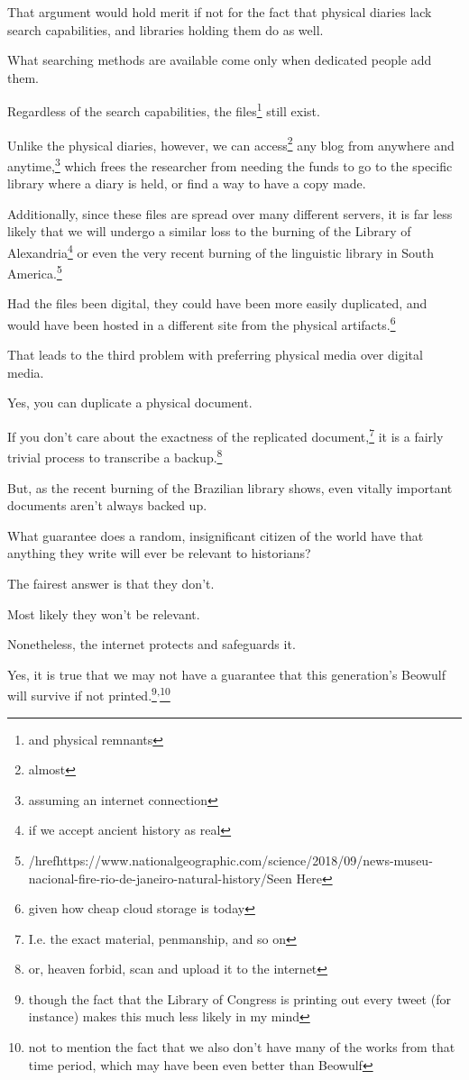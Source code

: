 \documentclass[12pt]{article}[titlepage]
\newcommand{\1}{\={a}}
\newcommand{\2}{\={e}}
\newcommand{\3}{\={\i}}
\newcommand{\4}{\=o}
\newcommand{\5}{\=u}
\newcommand{\6}{\={A}}
\renewcommand{\,}{\textsuperscript{,}}
\begin{document}
That argument would hold merit if not for the fact that physical diaries lack search capabilities, and libraries holding them do as well.

What searching methods are available come only when dedicated people add them.

Regardless of the search capabilities, the files\footnote{and physical remnants} still exist.

Unlike the physical diaries, however, we can access\footnote{almost} any blog from anywhere and anytime,\footnote{assuming an internet connection} which frees the researcher from needing the funds to go to the specific library where a diary is held, or find a way to have a copy made.


Additionally, since these files are spread over many different servers, it is far less likely that we will undergo a similar loss to the burning of the Library of Alexandria\footnote{if we accept ancient history as real} or even the very recent burning of the linguistic library in South America.\footnote{/href{https://www.nationalgeographic.com/science/2018/09/news-museu-nacional-fire-rio-de-janeiro-natural-history/}{Seen Here}}

Had the files been digital, they could have been more easily duplicated, and would have been hosted in a different site from the physical artifacts.\footnote{given how cheap cloud storage is today}


That leads to the third problem with preferring physical media over digital media.

Yes, you can duplicate a physical document.

If you don’t care about the exactness of the replicated document,\footnote{I.e. the exact material, penmanship, and so on} it is a fairly trivial process to transcribe a backup.\footnote{or, heaven forbid, scan and upload it to the internet}

But, as the recent burning of the Brazilian library shows, even vitally important documents aren’t always backed up.

What guarantee does a random, insignificant citizen of the world have that anything they write will ever be relevant to historians?


The fairest answer is that they don’t.

Most likely they won’t be relevant.

Nonetheless, the internet protects and safeguards it.

Yes, it is true that we may not have a guarantee that this generation’s Beowulf will survive if not printed.\footnote{though the fact that the Library of Congress is printing out every tweet (for instance) makes this much less likely in my mind}\,\footnote{not to mention the fact that we also don’t have many of the works from that time period, which may have been even better than Beowulf}
\end{document}
